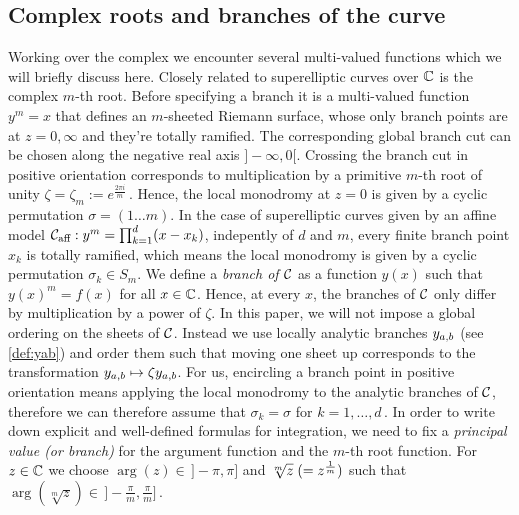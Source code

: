 \documentclass[main.tex]{subfiles}
\begin{document}
   

  
  \subsection{Complex roots and branches of the curve}\label{subsec:roots_branches}

  
  Working over the complex we encounter several multi-valued functions which we will briefly discuss here.  Closely related to superelliptic curves over $\mathbb{C}$ is the complex $m$-th root. Before specifying
  a branch it is a multi-valued function $y^m = x$ that defines an $m$-sheeted Riemann surface, whose only branch points are at $z = 0,\infty$ and they're totally ramified. The corresponding global
  branch cut can be chosen along the negative real axis $]\!-\infty,0[$. Crossing the branch cut in positive orientation corresponds to multiplication by  a primitive $m$-th root of unity
  $\zeta = \zeta_m
  := e^{\frac{2\pi i }{m}}$\,. Hence, the local monodromy at $z = 0$ is given by a cyclic permutation $\sigma = (1 \dots m)$. \abstandl
 In the case of superelliptic curves given by an affine model $\mathcal{C}_{\text{aff}} : y^m = \prod_{k = 1}^d (x - x_k)$, indepently of $d$ and $m$, every finite branch point $x_k$ is totally ramified, which
 means the local monodromy is given by a cyclic permutation $\sigma_k \in S_m$. We define a 
 \emph{branch of $\mathcal{C}$} as a function
  $y(x)$ such that $y(x)^m = f(x)$ for all $x \in \mathbb{C}$. Hence, at every $x$, the branches of $\mathcal{C}$ only differ by multiplication by a power of $\zeta$. \abstandl
  In this paper, we will not impose a global ordering on the sheets of $\mathcal{C}$. Instead we use locally analytic branches $y_{a,b}$ (see \ref{def:yab}) and order them such that moving one sheet up corresponds to the
  transformation $y_{a,b} \mapsto \zeta y_{a,b}$. For us, encircling a branch point in positive orientation means applying 
  the local monodromy to the analytic branches of $\mathcal{C}$, therefore we can therefore assume that $\sigma_k = \sigma$ for $k = 1,\dots,d$\,. \abstandl
  In order to write down explicit and well-defined formulas for integration, we need to fix a \emph{principal value (or branch)} for the argument function and the $m$-th root function.
  For $z \in \mathbb{C}$ we choose $\arg(z) \in \,]\!\!-\pi,\pi]$ and $\sqrt[m]{z} \;( = z^{\frac{1}{m}} )$ such that $\arg(\sqrt[m]{z}) \in \, ]\!\!-\frac{\pi}{m},\frac{\pi}{m}]$\,. \abstandl



 
  
\end{document}
